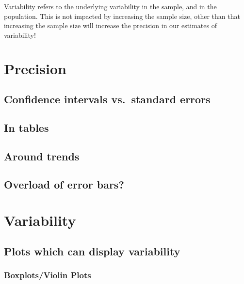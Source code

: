 \documentclass[
]{book}
\begin{document}
Variability refers to the underlying variability in the sample, and in the population. This is not impacted by increasing the sample size, other than that increasing the sample size will increase the precision in our estimates of variability!

\hypertarget{precision-1}{%
\section{Precision}\label{precision-1}}

\hypertarget{confidence-intervals-vs.-standard-errors}{%
\subsection{Confidence intervals vs.~standard errors}\label{confidence-intervals-vs.-standard-errors}}

\hypertarget{in-tables}{%
\subsection{In tables}\label{in-tables}}

\hypertarget{around-trends}{%
\subsection{Around trends}\label{around-trends}}

\hypertarget{overload-of-error-bars}{%
\subsection{Overload of error bars?}\label{overload-of-error-bars}}

\hypertarget{variability}{%
\section{Variability}\label{variability}}

\hypertarget{plots-which-can-display-variability}{%
\subsection{Plots which can display variability}\label{plots-which-can-display-variability}}

\hypertarget{boxplotsviolin-plots}{%
\subsubsection{Boxplots/Violin Plots}\label{boxplotsviolin-plots}}
\end{document}
